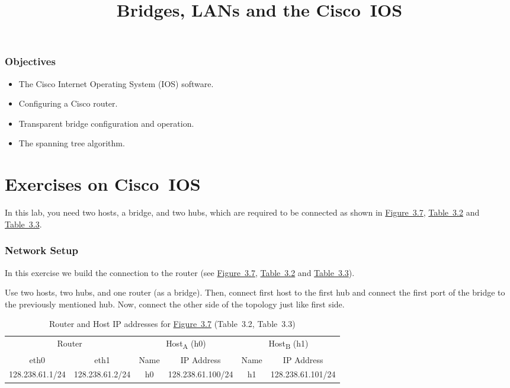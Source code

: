 \documentclass{../UTNetLab}
\title{Bridges, LANs and the Cisco~IOS}
\begin{document}
\section*{Objectives}
\begin{itemize}
    \item The Cisco Internet Operating System (IOS) software.
    \item Configuring a Cisco router.
    \item Transparent bridge configuration and operation.
    \item The spanning tree algorithm.
\end{itemize}

\part{Exercises on Cisco~IOS}
In this lab, you need two hosts, a bridge, and two hubs, which are required to be connected as shown in \hyperref[fig:3.7]{Figure~3.7}, \hyperref[tab:3.2]{Table~3.2} and \hyperref[tab:3.3]{Table~3.3}.

\section{Network Setup}
In this exercise we build the connection to the router (see \hyperref[fig:3.7]{Figure~3.7}, \hyperref[tab:3.2]{Table~3.2} and \hyperref[tab:3.3]{Table~3.3}).

Use two hosts, two hubs, and one router (as a bridge).
Then, connect first host to the first hub and connect the first port of the bridge to the previously mentioned hub.
Now, connect the other side of the topology just like first side.

\begin{table}[H]
    \caption{Router and Host IP addresses for \hyperref[fig:3.7]{Figure~3.7} (Table~3.2\label{tab:3.2}, Table~3.3\label{tab:3.3})}
    \centering
    \begin{tabular}{ *2c|*2c|*2c }
        \hline \hline  
        \multicolumn{2}{c|}{Router} & \multicolumn{2}{c|}{Host\textsubscript{A} (h0)} & \multicolumn{2}{c}{Host\textsubscript{B} (h1)}                                                \\
        eth0                        & eth1                                            & Name                                           & IP Address        & Name & IP Address        \\
        \hline
        128.238.61.1/24             & 128.238.61.2/24                                 & h0                                             & 128.238.61.100/24 & h1   & 128.238.61.101/24 \\
        \hline \hline
    \end{tabular}
\end{table}
\end{document}
